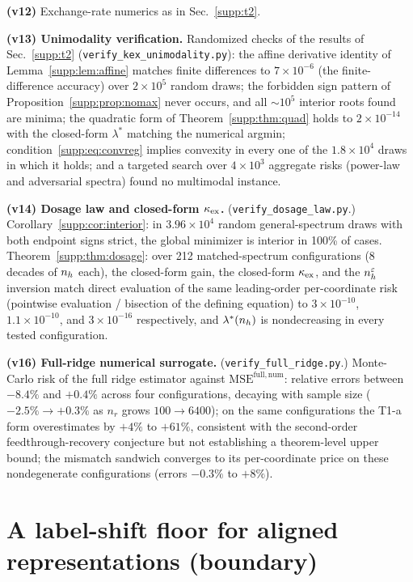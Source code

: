 \textbf{(v12)} Exchange-rate numerics as in Sec.~\ref{supp:t2}.

\textbf{(v13) Unimodality verification.} Randomized checks of the results of Sec.~\ref{supp:t2} (\texttt{verify\_kex\_unimodality.py}): the affine derivative identity of Lemma~\ref{supp:lem:affine} matches finite differences to $7\times10^{-6}$ (the finite-difference accuracy) over $2\times10^5$ random draws; the forbidden sign pattern of Proposition~\ref{supp:prop:nomax} never occurs, and all $\sim10^5$ interior roots found are minima; the quadratic form of Theorem~\ref{supp:thm:quad} holds to $2\times10^{-14}$ with the closed-form $\lambda^*$ matching the numerical argmin; condition~\eqref{supp:eq:convreg} implies convexity in every one of the $1.8\times10^4$ draws in which it holds; and a targeted search over $4\times10^3$ aggregate risks (power-law and adversarial spectra) found no multimodal instance.

\textbf{(v14) Dosage law and closed-form $\kappa_{\mathrm{ex}}$.} (\texttt{verify\_dosage\_law.py}.) Corollary~\ref{supp:cor:interior}: in $3.96\times10^4$ random general-spectrum draws with both endpoint signs strict, the global minimizer is interior in 100\% of cases. Theorem~\ref{supp:thm:dosage}: over 212 matched-spectrum configurations (8 decades of $n_h$ each), the closed-form gain, the closed-form $\kappa_{\mathrm{ex}}$, and the $n_h^\varepsilon$ inversion match direct evaluation of the same leading-order per-coordinate risk (pointwise evaluation / bisection of the defining equation) to $3\times10^{-10}$, $1.1\times10^{-10}$, and $3\times10^{-16}$ respectively, and $\lambda^*(n_h)$ is nondecreasing in every tested configuration.

\textbf{(v16) Full-ridge numerical surrogate.} (\texttt{verify\_full\_ridge.py}.) Monte-Carlo risk of the full ridge estimator against $\mathrm{MSE}^{\mathrm{full,num}}$: relative errors between $-8.4\%$ and $+0.4\%$ across four configurations, decaying with sample size ($-2.5\% \to +0.3\%$ as $n_r$ grows $100 \to 6400$); on the same configurations the T1-a form overestimates by $+4\%$ to $+61\%$, consistent with the second-order feedthrough-recovery conjecture but not establishing a theorem-level upper bound; the mismatch sandwich converges to its per-coordinate price on these nondegenerate configurations (errors $-0.3\%$ to $+8\%$).

\section{A label-shift floor for aligned representations (boundary)}
\label{supp:zhao}

